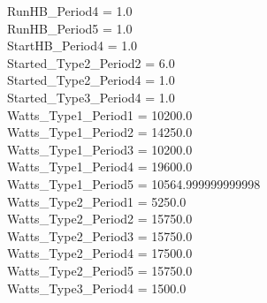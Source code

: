 RunHB\_Period4 = 1.0\\
RunHB\_Period5 = 1.0\\
StartHB\_Period4 = 1.0\\
Started\_Type2\_Period2 = 6.0\\
Started\_Type2\_Period4 = 1.0\\
Started\_Type3\_Period4 = 1.0\\
Watts\_Type1\_Period1 = 10200.0\\
Watts\_Type1\_Period2 = 14250.0\\
Watts\_Type1\_Period3 = 10200.0\\
Watts\_Type1\_Period4 = 19600.0\\
Watts\_Type1\_Period5 = 10564.999999999998\\
Watts\_Type2\_Period1 = 5250.0\\
Watts\_Type2\_Period2 = 15750.0\\
Watts\_Type2\_Period3 = 15750.0\\
Watts\_Type2\_Period4 = 17500.0\\
Watts\_Type2\_Period5 = 15750.0\\
Watts\_Type3\_Period4 = 1500.0\\
